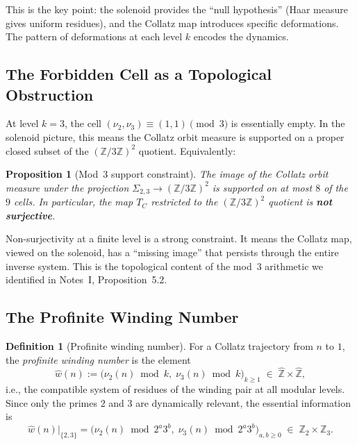 \documentclass[11pt,a4paper]{article}
\newcommand{\Z}{\mathbb{Z}}
\newcommand{\Zhat}{\widehat{\Z}}
\theoremstyle{plain}
\newtheorem{proposition}[theorem]{Proposition}
\theoremstyle{definition}
\newtheorem{definition}[theorem]{Definition}
\begin{document}
This is the key point: the solenoid provides the ``null hypothesis'' (Haar measure gives uniform residues), and the Collatz map introduces specific deformations. The pattern of deformations at each level $k$ encodes the dynamics.


\subsection{The Forbidden Cell as a Topological Obstruction}

At level $k = 3$, the cell $(\nu_2, \nu_3) \equiv (1,1) \pmod{3}$ is essentially empty. In the solenoid picture, this means the Collatz orbit measure is supported on a proper closed subset of the $(\Z/3\Z)^2$ quotient. Equivalently:

\begin{proposition}[Mod~3 support constraint]\label{prop:mod3-support}
    The image of the Collatz orbit measure under the projection $\Sigma_{2,3} \to (\Z/3\Z)^2$ is supported on at most $8$ of the $9$ cells. In particular, the map $T_C$ restricted to the $(\Z/3\Z)^2$ quotient is \textbf{not surjective}.
\end{proposition}

Non-surjectivity at a finite level is a strong constraint. It means the Collatz map, viewed on the solenoid, has a ``missing image'' that persists through the entire inverse system. This is the topological content of the mod~$3$ arithmetic we identified in Notes~I, Proposition~5.2.


\subsection{The Profinite Winding Number}

\begin{definition}[Profinite winding number]\label{def:profinite-winding}
    For a Collatz trajectory from $n$ to $1$, the \emph{profinite winding number} is the element
    \begin{equation}
        \hat{w}(n) := \bigl(\nu_2(n) \bmod k,\; \nu_3(n) \bmod k\bigr)_{k \geq 1} \;\in\; \Zhat \times \Zhat,
    \end{equation}
    i.e., the compatible system of residues of the winding pair at all modular levels. Since only the primes $2$ and $3$ are dynamically relevant, the essential information is
    \begin{equation}
        \hat{w}(n)\big|_{\{2,3\}} = \bigl(\nu_2(n) \bmod 2^a 3^b,\; \nu_3(n) \bmod 2^a 3^b\bigr)_{a,b \geq 0} \;\in\; \Z_2 \times \Z_3.
    \end{equation}
\end{definition}
\end{document}
